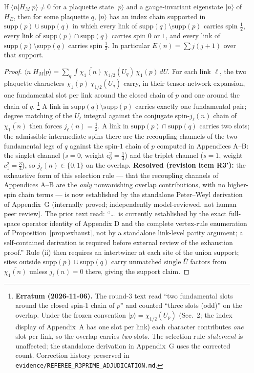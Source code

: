 \begin{lemma}\label{lem:exhaust1}
If $\langle n|H_M|p\rangle\ne0$ for a plaquette state $|p\rangle$ and a
gauge-invariant eigenstate $|n\rangle$ of $H_E$, then for some plaquette
$q$, $|n\rangle$ has an index chain supported in
$\mathrm{supp}(p)\cup\mathrm{supp}(q)$ in which every link of
$\mathrm{supp}(q)\setminus\mathrm{supp}(p)$ carries spin $\tfrac12$, every
link of $\mathrm{supp}(p)\cap\mathrm{supp}(q)$ carries spin $0$ or $1$, and
every link of $\mathrm{supp}(p)\setminus\mathrm{supp}(q)$ carries spin
$\tfrac12$. In particular $E(n)=\sum j(j{+}1)$ over that support.
\end{lemma}
\begin{proof}
$\langle n|H_M|p\rangle=\sum_{q}\int\overline{\chi_1(n)}\,\chi_{1/2}(U_q)\,
\chi_1(p)\,dU$. For each link $\ell$, the two plaquette
characters $\chi_1(p)\,\chi_{1/2}(U_q)$ carry, in their tensor-network
expansion, one fundamental slot per link around the closed chain of $p$
and one around the chain of $q$.
\footnote{\textbf{Erratum (2026-11-06).} The round-3 text read ``two
fundamental slots around the closed spin-$1$ chain of $p$'' and counted
``three slots (odd)'' on the overlap. Under the frozen convention
$|p\rangle=\chi_{1/2}(U_p)$ (Sec.~2; the index display of Appendix~A has
one slot per link) each character contributes \emph{one} slot per link,
so the overlap carries \emph{two} slots. The selection-rule
\emph{statement} is unaffected; the standalone derivation in
Appendix~G uses the corrected count. Correction history preserved in
\texttt{evidence/REFEREE\_R3PRIME\_ADJUDICATION.md}.} A link in
$\mathrm{supp}(q)\setminus\mathrm{supp}(p)$ carries exactly one
fundamental pair; degree matching of the $U_\ell$ integral against the
conjugate spin-$j_\ell(n)$ chain of $\overline{\chi_1(n)}$ then forces
$j_\ell(n)=\tfrac12$. A link in $\mathrm{supp}(p)\cap\mathrm{supp}(q)$
carries two slots; the admissible intermediate spins there are the
recoupling channels of the two fundamental legs of $q$ against the
spin-$1$ chain of $p$ computed in Appendices A--B: the singlet channel
($s=0$, weight $c_0^2=\tfrac14$) and the triplet channel ($s=1$, weight
$c_1^2=\tfrac34$), so $j_\ell(n)\in\{0,1\}$ on the overlap.
\textbf{Resolved (revision item R3'):} the exhaustive form of this
selection rule --- that the recoupling channels of Appendices A--B are
the \emph{only} nonvanishing overlap contributions, with no higher-spin
chain terms --- is now established by the standalone Peter--Weyl
derivation of Appendix~G (internally proved; independently
model-reviewed, not human peer review). The prior text read: ``\ldots\ is
currently established by the exact full-space operator identity of
Appendix D and the complete vertex-rule enumeration of
Proposition~\ref{prop:exhaust}, not by a standalone link-level parity
argument; a self-contained derivation is required before external review
of the exhaustion proof.'' Rule (ii) then requires an intertwiner
at each site of the union support; sites outside
$\mathrm{supp}(p)\cup\mathrm{supp}(q)$ carry unmatched single $\bar U$
factors from $\overline{\chi_1(n)}$ unless $j_\ell(n)=0$ there, giving the
support claim.
\end{proof}

